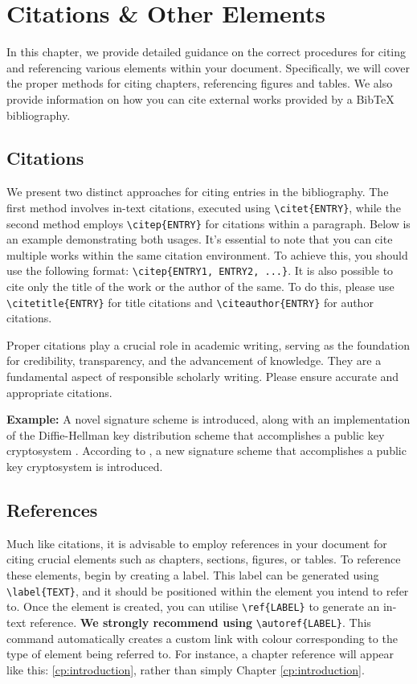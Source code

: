 \chapter{Citations \& Other Elements}
\label{cp:citations}
In this chapter, we provide detailed guidance on the correct procedures for citing and referencing various elements within your document. Specifically, we will cover the proper methods for citing chapters, referencing figures and tables. We also provide information on how you can cite external works provided by a BibTeX bibliography.

\section{Citations}
\label{sec:citations}
We present two distinct approaches for citing entries in the bibliography. The first method involves in-text citations, executed using \verb|\citet{ENTRY}|, while the second method employs \verb|\citep{ENTRY}| for citations within a paragraph. Below is an example demonstrating both usages. It's essential to note that you can cite multiple works within the same citation environment. To achieve this, you should use the following format: \verb|\citep{ENTRY1, ENTRY2, ...}|. It is also possible to cite only the title of the work or the author of the same. To do this, please use \verb|\citetitle{ENTRY}| for title citations and \verb|\citeauthor{ENTRY}| for author citations.

\begin{importantbox}
Proper citations play a crucial role in academic writing, serving as the foundation for credibility, transparency, and the advancement of knowledge. They are a fundamental aspect of responsible scholarly writing. Please ensure accurate and appropriate citations.
\end{importantbox}

\noindent\textbf{Example:} A novel signature scheme is introduced, along with an implementation of the Diffie-Hellman key distribution scheme that accomplishes a public key cryptosystem \citep{Elgamal1985}. According to \citet{Elgamal1985}, a new signature scheme that accomplishes a public key cryptosystem is introduced.

\section{References}
Much like citations, it is advisable to employ references in your document for citing crucial elements such as chapters, sections, figures, or tables. To reference these elements, begin by creating a label. This label can be generated using \verb|\label{TEXT}|, and it should be positioned within the element you intend to refer to. Once the element is created, you can utilise \verb|\ref{LABEL}| to generate an in-text reference. \textbf{We strongly recommend using} \verb|\autoref{LABEL}|. This command automatically creates a custom link with colour corresponding to the type of element being referred to. For instance, a chapter reference will appear like this: \autoref{cp:introduction}, rather than simply Chapter \ref{cp:introduction}. 


